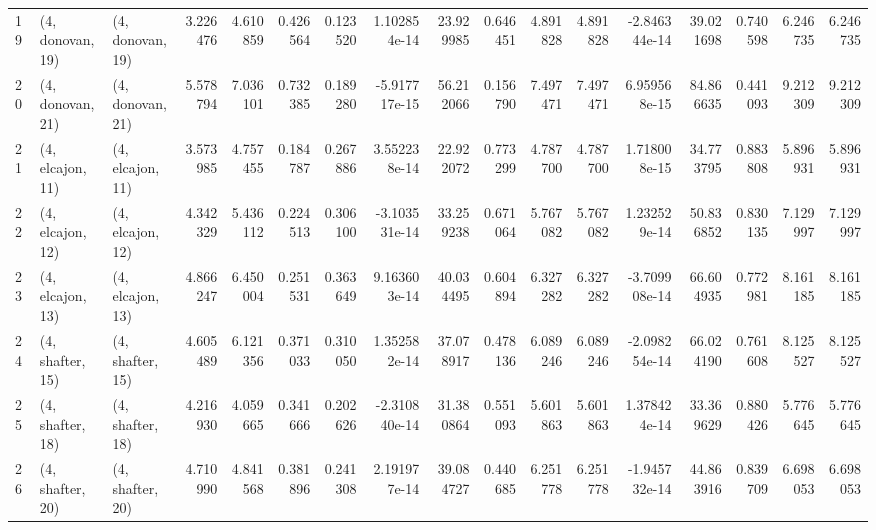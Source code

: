 \begin{tabular}{lllrrrrrrrrrrrrrr}
19 &  (4, donovan, 19) &  (4, donovan, 19) &  3.226476 &  4.610859 &   0.426564 &  0.123520 &  1.102854e-14 &   23.929985 &  0.646451 &   4.891828 &   4.891828 & -2.846344e-14 &   39.021698 &  0.740598 &   6.246735 &   6.246735 \\
20 &  (4, donovan, 21) &  (4, donovan, 21) &  5.578794 &  7.036101 &   0.732385 &  0.189280 & -5.917717e-15 &   56.212066 &  0.156790 &   7.497471 &   7.497471 &  6.959568e-15 &   84.866635 &  0.441093 &   9.212309 &   9.212309 \\
21 &  (4, elcajon, 11) &  (4, elcajon, 11) &  3.573985 &  4.757455 &   0.184787 &  0.267886 &  3.552238e-14 &   22.922072 &  0.773299 &   4.787700 &   4.787700 &  1.718008e-15 &   34.773795 &  0.883808 &   5.896931 &   5.896931 \\
22 &  (4, elcajon, 12) &  (4, elcajon, 12) &  4.342329 &  5.436112 &   0.224513 &  0.306100 & -3.103531e-14 &   33.259238 &  0.671064 &   5.767082 &   5.767082 &  1.232529e-14 &   50.836852 &  0.830135 &   7.129997 &   7.129997 \\
23 &  (4, elcajon, 13) &  (4, elcajon, 13) &  4.866247 &  6.450004 &   0.251531 &  0.363649 &  9.163603e-14 &   40.034495 &  0.604894 &   6.327282 &   6.327282 & -3.709908e-14 &   66.604935 &  0.772981 &   8.161185 &   8.161185 \\
24 &  (4, shafter, 15) &  (4, shafter, 15) &  4.605489 &  6.121356 &   0.371033 &  0.310050 &  1.352582e-14 &   37.078917 &  0.478136 &   6.089246 &   6.089246 & -2.098254e-14 &   66.024190 &  0.761608 &   8.125527 &   8.125527 \\
25 &  (4, shafter, 18) &  (4, shafter, 18) &  4.216930 &  4.059665 &   0.341666 &  0.202626 & -2.310840e-14 &   31.380864 &  0.551093 &   5.601863 &   5.601863 &  1.378424e-14 &   33.369629 &  0.880426 &   5.776645 &   5.776645 \\
26 &  (4, shafter, 20) &  (4, shafter, 20) &  4.710990 &  4.841568 &   0.381896 &  0.241308 &  2.191977e-14 &   39.084727 &  0.440685 &   6.251778 &   6.251778 & -1.945732e-14 &   44.863916 &  0.839709 &   6.698053 &   6.698053 \\
\bottomrule
\end{tabular}

